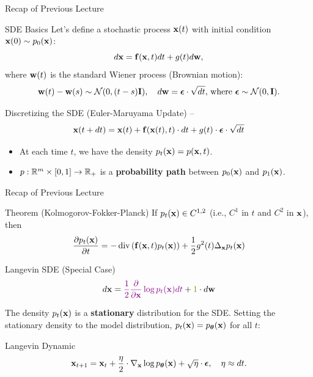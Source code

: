 \documentclass{beamer}
\begin{document}
\begin{frame}{Recap of Previous Lecture}
	\vspace{-0.2cm}
	\begin{block}{SDE Basics}
		Let's define a stochastic process $\mathbf{x}(t)$ with initial condition $\mathbf{x}(0) \sim p_0(\mathbf{x})$:
		\[
			d\mathbf{x} = \mathbf{f}(\mathbf{x}, t) dt + g(t) d \mathbf{w}, 
		\]
		where $\mathbf{w}(t)$ is the standard Wiener process (Brownian motion):
		\vspace{-0.2cm}
		\[		
			\mathbf{w}(t) - \mathbf{w}(s) \sim \mathcal{N}(0, (t - s) \mathbf{I}), \quad d \mathbf{w} = \boldsymbol{\epsilon} \cdot \sqrt{dt}, \, \text{where } \boldsymbol{\epsilon} \sim \mathcal{N}(0, \mathbf{I}).
		\]
	\end{block}
	\vspace{-0.3cm}
	\begin{block}{Discretizing the SDE (Euler-Maruyama Update) – \SDESolve}
		\vspace{-0.3cm}
		\[
			\mathbf{x}(t + dt) = \mathbf{x}(t) + \mathbf{f}(\mathbf{x}(t), t) \cdot dt + g(t) \cdot \boldsymbol{\epsilon} \cdot \sqrt{dt}
		\]
		\vspace{-0.3cm}
	\end{block}
	\begin{itemize}
		\item At each time $t$, we have the density $p_t(\mathbf{x}) = p(\mathbf{x}, t)$.
		\item $p: \mathbb{R}^m \times [0, 1] \rightarrow \mathbb{R}_+$ is a \textbf{probability path} between $p_0(\mathbf{x})$ and $p_1(\mathbf{x})$.
	\end{itemize}
\end{frame}
\begin{frame}{Recap of Previous Lecture}
 	\begin{block}{Theorem (Kolmogorov-Fokker-Planck)}
 		If $p_t(\mathbf{x}) \in C^{1,2}$ (i.e., $C^1$ in $t$ and $C^2$ in $\mathbf{x}$), then
 		\vspace{-0.3cm}
 		\[
 			\frac{\partial p_t(\mathbf{x})}{\partial t} = - \operatorname{div}\left(\mathbf{f}(\mathbf{x}, t) p_t(\mathbf{x})\right) + \frac{1}{2}g^2(t) \Delta_{\mathbf{x}}p_t(\mathbf{x})
 		\]
 		\vspace{-0.5cm}
 	\end{block}
 	\begin{block}{Langevin SDE (Special Case)}
 		\vspace{-0.3cm}
 		\[
 			d \bx = {\color{violet}\frac{1}{2} \frac{\partial}{\partial \bx} \log p_t(\bx) d t} + {\color{olive}1} \cdot d \bw
 		\]
 		\vspace{-0.3cm}
 	\end{block}
 	The density $p_t(\mathbf{x})$ is a \textbf{stationary} distribution for the SDE.
	Setting the stationary density to the model distribution, $p_t(\mathbf{x}) = p_{\boldsymbol{\theta}}(\mathbf{x})$ for all $t$:
	\begin{block}{Langevin Dynamic}
		\vspace{-0.2cm}
		\[
			\mathbf{x}_{t + 1} = \mathbf{x}_t + \frac{\eta}{2} \cdot \nabla_{\mathbf{x}} \log p_{\boldsymbol{\theta}}(\mathbf{x}) + \sqrt{\eta} \cdot \boldsymbol{\epsilon}, \quad \eta \approx dt.
		\]
	\end{block}
\end{frame}
\end{document}
